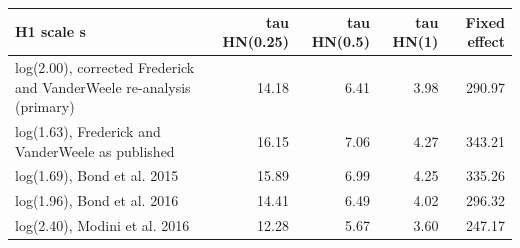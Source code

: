 
\begin{tabular}{lrrrr}
\toprule
H1 scale s & tau HN(0.25) & tau HN(0.5) & tau HN(1) & Fixed effect\\
\midrule
log(2.00), corrected Frederick and VanderWeele re-analysis (primary) & 14.18 & 6.41 & 3.98 & 290.97\\
log(1.63), Frederick and VanderWeele as published & 16.15 & 7.06 & 4.27 & 343.21\\
log(1.69), Bond et al. 2015 & 15.89 & 6.99 & 4.25 & 335.26\\
log(1.96), Bond et al. 2016 & 14.41 & 6.49 & 4.02 & 296.32\\
log(2.40), Modini et al. 2016 & 12.28 & 5.67 & 3.60 & 247.17\\
\bottomrule
\end{tabular}
